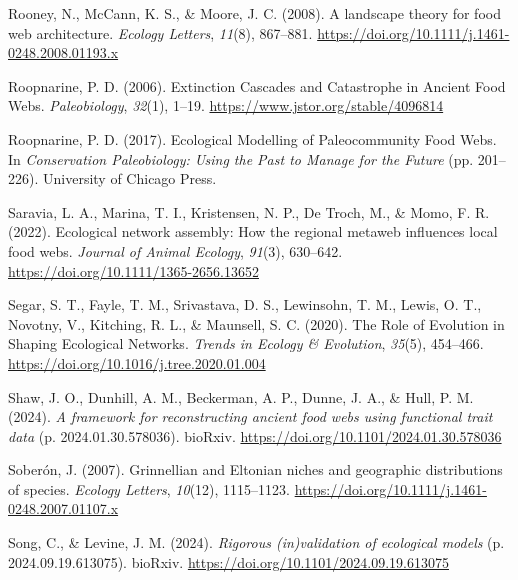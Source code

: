\documentclass[
]{article}
\newlength{\cslhangindent}
\newenvironment{CSLReferences}[2] %
 {\begin{list}{}{%
  \setlength{\itemindent}{0pt}
  \setlength{\leftmargin}{0pt}
  \setlength{\parsep}{0pt}
  \ifodd #1
   \setlength{\leftmargin}{\cslhangindent}
   \setlength{\itemindent}{-1\cslhangindent}
  \fi
  \setlength{\itemsep}{#2\baselineskip}}}
 {\end{list}}
\begin{document}
\begin{CSLReferences}{1}{0}
Rooney, N., McCann, K. S., \& Moore, J. C. (2008). A landscape theory
for food web architecture. \emph{Ecology Letters}, \emph{11}(8),
867--881. \url{https://doi.org/10.1111/j.1461-0248.2008.01193.x}

Roopnarine, P. D. (2006). Extinction {Cascades} and {Catastrophe} in
{Ancient Food Webs}. \emph{Paleobiology}, \emph{32}(1), 1--19.
\url{https://www.jstor.org/stable/4096814}

Roopnarine, P. D. (2017). Ecological {Modelling} of {Paleocommunity Food
Webs}. In \emph{Conservation {Paleobiology}: {Using} the {Past} to
{Manage} for the {Future}} (pp. 201--226). University of Chicago Press.

Saravia, L. A., Marina, T. I., Kristensen, N. P., De Troch, M., \& Momo,
F. R. (2022). Ecological network assembly: {How} the regional metaweb
influences local food webs. \emph{Journal of Animal Ecology},
\emph{91}(3), 630--642. \url{https://doi.org/10.1111/1365-2656.13652}

Segar, S. T., Fayle, T. M., Srivastava, D. S., Lewinsohn, T. M., Lewis,
O. T., Novotny, V., Kitching, R. L., \& Maunsell, S. C. (2020). The
{Role} of {Evolution} in {Shaping Ecological Networks}. \emph{Trends in
Ecology \& Evolution}, \emph{35}(5), 454--466.
\url{https://doi.org/10.1016/j.tree.2020.01.004}

Shaw, J. O., Dunhill, A. M., Beckerman, A. P., Dunne, J. A., \& Hull, P.
M. (2024). \emph{A framework for reconstructing ancient food webs using
functional trait data} (p. 2024.01.30.578036). bioRxiv.
\url{https://doi.org/10.1101/2024.01.30.578036}

Soberón, J. (2007). Grinnellian and {Eltonian} niches and geographic
distributions of species. \emph{Ecology Letters}, \emph{10}(12),
1115--1123. \url{https://doi.org/10.1111/j.1461-0248.2007.01107.x}

Song, C., \& Levine, J. M. (2024). \emph{Rigorous (in)validation of
ecological models} (p. 2024.09.19.613075). bioRxiv.
\url{https://doi.org/10.1101/2024.09.19.613075}


\end{CSLReferences}
\end{document}
